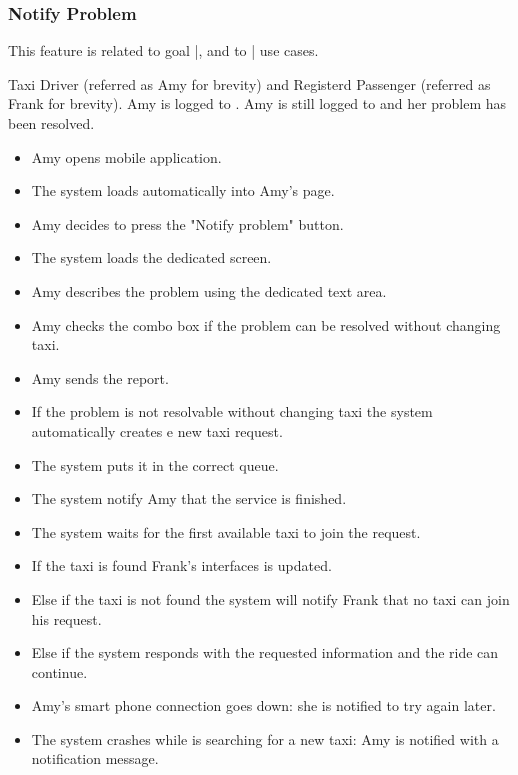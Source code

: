 \subsubsection{Notify Problem}
This feature is related to goal |, and to | use cases.
\begin{itemize}
	 Taxi Driver (referred as Amy for brevity) and Registerd Passenger (referred as Frank for brevity).
	 Amy is logged to \myTaxiService{}.
	 Amy is still logged to \myTaxiService{} and her problem has been resolved.
	\begin{itemize}
		\item Amy opens \myTaxiService{} mobile application.
		\item The system loads automatically into Amy's page.
		\item Amy decides to press the "Notify problem" button.
		\item The system loads the dedicated screen.
		\item Amy describes the problem using the dedicated text area.
		\item Amy checks the combo box if the problem can be resolved without changing taxi.
		\item Amy sends the report.
		\item If the problem is not resolvable without changing taxi the system automatically creates e new taxi request.
		\item The system puts it in the correct queue.
		\item The system notify Amy that the service is finished.
		\item The system waits for the first available taxi to join the request.
		\item If the taxi is found Frank's interfaces is updated.
		\item Else if the taxi is not found the system will notify Frank that no taxi can join his request.
		\item Else if the system responds with the requested information and the ride can continue.
	\end{itemize}
	\begin{itemize}
		\item Amy's smart phone connection goes down: she is notified to try again later.
		\item The system crashes while is searching for a new taxi: Amy is notified with a notification message.
	\end{itemize}
\end{itemize}
